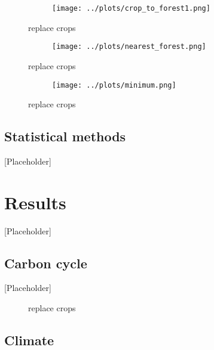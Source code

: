 \documentclass[]{article}
\begin{document}
\begin{figure}[H]
    \centering
    \begin{subfigure}[b]{\linewidth}
        \texttt{[image: ../plots/crop\_to\_forest1.png]}
    \end{subfigure}
    \caption{replace crops}
    \label{fig:to_forest}
\end{figure}
\begin{figure}[H]
    \centering
    \begin{subfigure}[b]{\linewidth}
        \texttt{[image: ../plots/nearest\_forest.png]}
    \end{subfigure}
    \caption{replace crops}
    \label{fig:nearest_forest}
\end{figure}
\begin{figure}[H]
    \centering
    \begin{subfigure}[b]{\linewidth}
        \texttt{[image: ../plots/minimum.png]}
    \end{subfigure}
    \caption{replace crops}
    \label{fig:minimum}
\end{figure}

\subsection{Statistical methods}

[Placeholder]

\section{Results}

[Placeholder]

\subsection{Carbon cycle}

[Placeholder]

\begin{figure}[H]
    \centering
    \begin{subfigure}[b]{\linewidth}
        
    \end{subfigure}
    \caption{replace crops}
    \label{fig:global_co2}
\end{figure}

\subsection{Climate}
\end{document}
